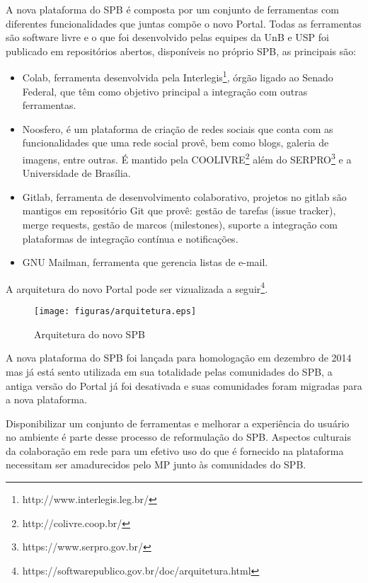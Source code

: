 A nova plataforma do SPB é composta por um conjunto de ferramentas com diferentes funcionalidades
que juntas compõe o novo Portal. Todas as ferramentas são software livre e o que foi desenvolvido pelas equipes da UnB e 
USP foi publicado em repositórios abertos, disponíveis no próprio SPB, as principais são:
\begin{itemize}

\item Colab, ferramenta desenvolvida pela Interlegis\footnote{http://www.interlegis.leg.br/}, órgão ligado 
ao Senado Federal, que têm como objetivo principal a integração com outras ferramentas.

\item Noosfero, é um plataforma de criação de redes sociais que conta com as funcionalidades
que uma rede social provê, bem como blogs, galeria de imagens, entre outras. É mantido pela 
COOLIVRE\footnote{http://colivre.coop.br/} além do SERPRO\footnote{https://www.serpro.gov.br/} e a 
Universidade de Brasília.

\item Gitlab, ferramenta de desenvolvimento colaborativo, projetos no gitlab são mantigos em 
repositório Git que provê: gestão de tarefas (issue tracker), merge requests, 
gestão de marcos (milestones), suporte a integração com plataformas de integração contínua e notificações.

\item GNU Mailman, ferramenta que gerencia listas de e-mail.

\end{itemize}

A arquitetura do novo Portal pode ser vizualizada a seguir\footnote{https://softwarepublico.gov.br/doc/arquitetura.html}.

\begin{figure}[h]
	\centering
	\label{arquitetura}
		\texttt{[image: figuras/arquitetura.eps]}
	\caption{Arquitetura do novo SPB}
\end{figure}


A nova plataforma do SPB foi lançada para homologação em dezembro de 2014 mas já
está sento utilizada em sua totalidade pelas comunidades do SPB, a antiga versão do Portal 
já foi desativada e suas comunidades foram migradas para a nova plataforma. 

Disponibilizar um conjunto de ferramentas e melhorar a experiência do usuário no 
ambiente é parte desse processo de reformulação do SPB. Aspectos culturais 
da colaboração em rede para um efetivo uso do que é fornecido na plataforma 
necessitam ser amadurecidos pelo MP junto às comunidades do SPB.







